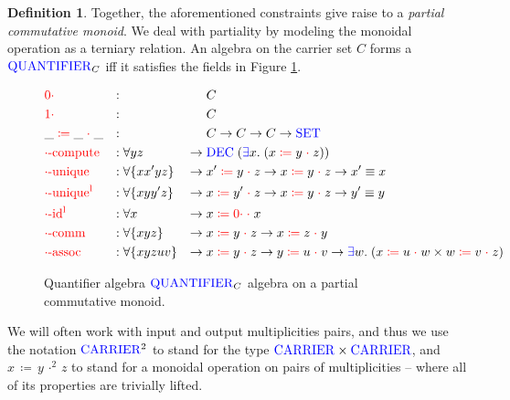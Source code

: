 \documentclass[a4paper,UKenglish,cleveref, autoref, thm-restate,authorcolumns]{lipics-v2019}
\theoremstyle{definition}
\newtheorem{nidefinition}[theorem]{Definition}
\newcommand{\type}[1]{\textcolor{blue}{\operatorname{#1}}}
\newcommand{\field}[1]{\textcolor{red}{\operatorname{#1}}}
\newcommand{\opsquared}[3]{#1 \, \coloneqq \, #2 \, \cdot^2 \, #3}
\newcommand{\op}[3]{#1 \; \field{\coloneqq} \; #2 \; \field{\cdot} \; #3}
\newcommand{\zero}{\field{0\cdot}}
\newcommand{\one}{\field{1\cdot}}
\newcommand{\Set}{\type{SET}}
\newcommand{\Carrier}{\type{CARRIER}}
\newcommand{\Quantifier}{\type{QUANTIFIER}}
\begin{document}
\begin{nidefinition}
  Together, the aforementioned constraints give raise to a \emph{partial commutative monoid}.
  We deal with partiality by modeling the monoidal operation as a terniary relation.
  An algebra on the carrier set $C$ forms a $\Quantifier_C$ iff it satisfies the fields in Figure \ref{fig:multiplicities}.
  
  \begin{figure}[h]
  \begin{equation}
  \begin{aligned}
    &\zero                  &:{} &                      &        & C \\
    &\one                   &:{} &                      &        & C \\
    &\op{\_}{\_}{\_}        &:{} &                      &        & C \to C \to C \to \Set \\
    &\field{\cdot-compute}  &:{} &\forall y z           & \to \; & \type{DEC} \; (\type{\exists} x . \; (\op{x}{y}{z})) \\
    &\field{\cdot-unique}   &:{} &\forall \{x x' y z\}  & \to \; & \op{x'}{y}{z} \to \op{x}{y}{z} \to x' \equiv x \\
    &\field{\cdot-unique^l} &:{} &\forall \{x y y' z\}  & \to \; & \op{x}{y'}{z} \to \op{x}{y}{z} \to y' \equiv y \\
    &\field{\cdot-id^l}     &:{} &\forall x             & \to \; & \op{x}{\zero}{x} \\
    &\field{\cdot-comm}     &:{} &\forall \{x y z\}     & \to \; & \op{x}{y}{z} \to \op{x}{z}{y} \\
    &\field{\cdot-assoc}    &:{} &\forall \{x y z u v\} & \to \; & \op{x}{y}{z} \to \op{y}{u}{v} \to \type{\exists} w . \; (\op{x}{u}{w} \times \op{w}{v}{z})
  \end{aligned}
  \end{equation}
  \caption{Quantifier algebra $\Quantifier_C$ algebra on a partial commutative monoid.}
  \label{fig:multiplicities}
  \end{figure}
\end{nidefinition}

\begin{note}
  We will often work with input and output multiplicities pairs, and thus we use the notation $\Carrier^2$ to stand for the type $\Carrier \times \Carrier$, and $\opsquared{x}{y}{z}$ to stand for a monoidal operation on pairs of multiplicities -- where all of its properties are trivially lifted.
\end{note}
\end{document}
